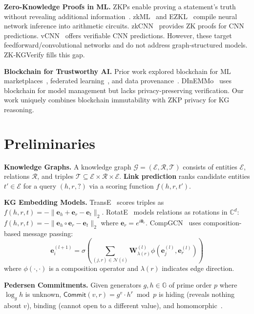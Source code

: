 \documentclass[runningheads]{llncs}
\newcommand{\CC}{\mathbb{C}}
\newcommand{\G}{\mathbb{G}}
\newcommand{\Commit}{\mathsf{Commit}}
\newcommand{\embed}{\mathbf{e}}
\newcommand{\vect}[1]{\mathbf{#1}}
\begin{document}
\textbf{Zero-Knowledge Proofs in ML.}
ZKPs enable proving a statement's truth without revealing additional information~\cite{goldwasser1989knowledge}. zkML~\cite{kang2022scaling} and EZKL~\cite{ezkl2023} compile neural network inference into arithmetic circuits. zkCNN~\cite{liu2021zkcnn} provides ZK proofs for CNN predictions. vCNN~\cite{lee2020vcnn} offers verifiable CNN predictions. However, these target feedforward/convolutional networks and do not address graph-structured models. ZK-KGVerify fills this gap.

\textbf{Blockchain for Trustworthy AI.}
Prior work explored blockchain for ML marketplaces~\cite{kurtulmus2018trustless}, federated learning~\cite{kim2019blockchained}, and data provenance~\cite{sarpatwar2019towards}. DInEMMo~\cite{dinEmmo2021} uses blockchain for model management but lacks privacy-preserving verification. Our work uniquely combines blockchain immutability with ZKP privacy for KG reasoning.

\section{Preliminaries}
\label{sec:preliminaries}

\textbf{Knowledge Graphs.}
A knowledge graph $\mathcal{G} = (\mathcal{E}, \mathcal{R}, \mathcal{T})$ consists of entities $\mathcal{E}$, relations $\mathcal{R}$, and triples $\mathcal{T} \subseteq \mathcal{E} \times \mathcal{R} \times \mathcal{E}$. \textbf{Link prediction} ranks candidate entities $t' \in \mathcal{E}$ for a query $(h, r, ?)$ via a scoring function $f(h, r, t')$.

\textbf{KG Embedding Models.}
TransE~\cite{bordes2013translating} scores triples as $f(h,r,t) = -\|\embed_h + \embed_r - \embed_t\|_2$. RotatE~\cite{sun2019rotate} models relations as rotations in $\CC^d$: $f(h,r,t) = -\|\embed_h \circ \embed_r - \embed_t\|_2$ where $\embed_r = e^{i\bm{\theta}_r}$. CompGCN~\cite{vashishth2020composition} uses composition-based message passing:
\begin{equation}
    \embed_i^{(l+1)} = \sigma\!\left( \sum_{(j,r) \in \mathcal{N}(i)} \vect{W}_{\lambda(r)}^{(l)} \phi(\embed_j^{(l)}, \embed_r^{(l)}) \right)
    \label{eq:compgcn}
\end{equation}
where $\phi(\cdot,\cdot)$ is a composition operator and $\lambda(r)$ indicates edge direction.

\textbf{Pedersen Commitments.}
Given generators $g, h \in \G$ of prime order $p$ where $\log_g h$ is unknown, $\Commit(v, r) = g^v \cdot h^r \bmod p$ is hiding (reveals nothing about $v$), binding (cannot open to a different value), and homomorphic~\cite{pedersen1991non}.
\end{document}
